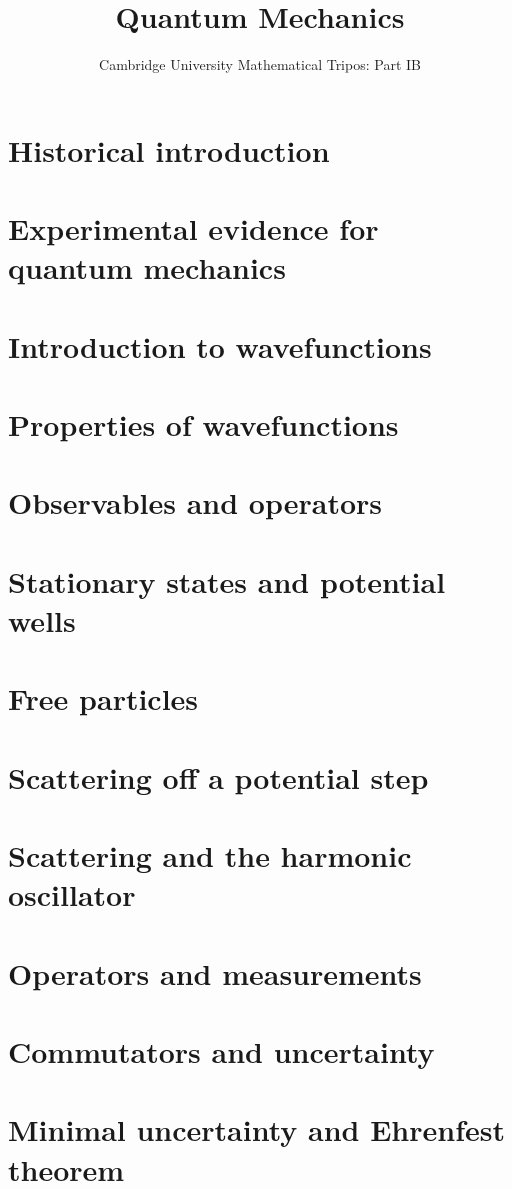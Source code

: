 \documentclass{article}
\title{Quantum Mechanics}
\author{Cambridge University Mathematical Tripos: Part IB}
\begin{document}
\maketitle

\tableofcontentsnewpage{}

\section{Historical introduction}

\section{Experimental evidence for quantum mechanics}

\section{Introduction to wavefunctions}

\section{Properties of wavefunctions}

\section{Observables and operators}

\section{Stationary states and potential wells}

\section{Free particles}

\section{Scattering off a potential step}

\section{Scattering and the harmonic oscillator}

\section{Operators and measurements}

\section{Commutators and uncertainty}

\section{Minimal uncertainty and Ehrenfest theorem}

\end{document}
